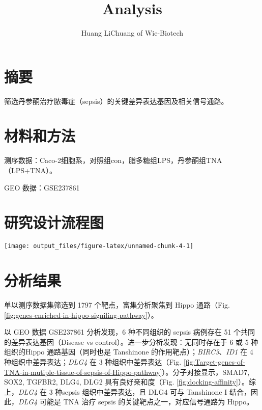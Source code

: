 \documentclass[
]{article}
\title{Analysis}
\author{Huang LiChuang of Wie-Biotech}
\date{}
\begin{document}
\maketitle

{
\setcounter{tocdepth}{3}
\tableofcontents
}
\listoffigures

\listoftables

\hypertarget{abstract}{%
\section{摘要}\label{abstract}}

筛选丹参酮治疗脓毒症（sepsis）的关键差异表达基因及相关信号通路。

\hypertarget{methods}{%
\section{材料和方法}\label{methods}}

测序数据：Caco-2细胞系，对照组con，脂多糖组LPS，丹参酮组TNA（LPS+TNA）。

GEO 数据：GSE237861

\hypertarget{route}{%
\section{研究设计流程图}\label{route}}

\texttt{[image: output\_files/figure-latex/unnamed-chunk-4-1]}

\hypertarget{results}{%
\section{分析结果}\label{results}}

单以测序数据集筛选到 1797 个靶点，富集分析聚焦到 Hippo 通路（Fig. \ref{fig:genes-enriched-in-hippo-signiling-pathway}）。

以 GEO 数据 GSE237861 分析发现，6 种不同组织的 sepsis 病例存在 51 个共同的差异表达基因（Disease vs control）。进一步分析发现：无同时存在于 6 或 5 种组织的Hippo 通路基因（同时也是 Tanshinone 的作用靶点）；\emph{BIRC3}、\emph{ID1} 在 4 种组织中差异表达；\emph{DLG4} 在 3 种组织中差异表达（Fig. \ref{fig:Target-genes-of-TNA-in-mutiple-tissue-of-sepsis-of-Hippo-pathway}）。分子对接显示，SMAD7, SOX2, TGFBR2, DLG4, DLG2 具有良好亲和度（Fig. \ref{fig:docking-affinity}）。综上，\emph{DLG4} 在 3 种sepsis 组织中差异表达，且 DLG4 可与 Tanshinone I 结合，因此，\emph{DLG4} 可能是 TNA 治疗 sepsis 的关键靶点之一，对应信号通路为 Hippo。
\end{document}

